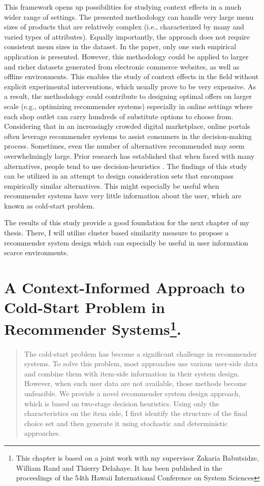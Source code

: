\documentclass[a4paper,12pt]{article}
\begin{document}
This framework opens up possibilities for studying context effects in a much wider range of settings. The presented methodology can handle very large menu sizes of products that are relatively complex (i.e., characterized by many and varied types of attributes). Equally importantly, the approach does not require consistent menu sizes in the dataset. In the paper, only one such empirical application is presented. However, this methodology could be applied to larger and richer datasets generated from electronic commerce websites, as well as offline environments. This enables the study of context effects in the field without explicit experimental interventions, which usually prove to be very expensive. As a result, the methodology could contribute to designing optimal offers on larger scale (e.g., optimizing recommender systems) especially in online settings where each shop outlet can carry hundreds of substitute options to choose from. Considering that in an increasingly crowded digital marketplace, online portals often leverage recommender systems to assist consumers in the decision-making process. Sometimes, even the number of alternatives recommended may seem overwhelmingly large. Prior research has established that when faced with many alternatives, people tend to use decision-heuristics \citep{fishburn1974exceptional}. The findings of this study can be utilized in an attempt to design consideration sets that encompass empirically similar alternatives. This might especially be useful when recommender systems have very little information about the user, which are known as cold-start problem. 

The results of this study provide a good foundation for the next chapter of my thesis. There, I will utilize cluster based similarity measure to propose a recommender system design which can especially be useful in user information scarce environments.




\newpage
\section{A Context-Informed Approach to Cold-Start Problem in Recommender Systems\footnote{This chapter is based on a joint work with my supervisor Zakaria Babutsidze, William Rand and Thierry Delahaye. It has been published in the proceedings of the 54th Hawaii International Conference on System Sciences}.}\label{chapter:hicssPaper}

\begin{abstract}
        The cold-start problem has become a significant challenge in recommender systems. To solve this problem, most approaches use various user-side data and combine them with item-side information in their system design. However, when such user data are not available, those methods become unfeasible. We provide a novel recommender system design approach, which is based on two-stage decision heuristics. Using only the characteristics on the item side, I first identify the structure of the final choice set and then generate it using stochastic and deterministic approaches.
        
\end{abstract}
\end{document}
